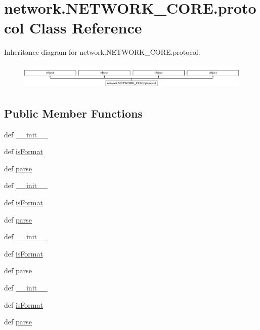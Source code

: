 \hypertarget{classnetwork_1_1NETWORK__CORE_1_1protocol}{}\section{network.\+N\+E\+T\+W\+O\+R\+K\+\_\+\+C\+O\+R\+E.\+protocol Class Reference}
\label{classnetwork_1_1NETWORK__CORE_1_1protocol}
Inheritance diagram for network.\+N\+E\+T\+W\+O\+R\+K\+\_\+\+C\+O\+R\+E.\+protocol\+:\begin{figure}[H]
\begin{center}
\leavevmode
\includegraphics[height=1.266968cm]{classnetwork_1_1NETWORK__CORE_1_1protocol}
\end{center}
\end{figure}
\subsection*{Public Member Functions}
\begin{DoxyCompactItemize}
\item 
def \hyperlink{classnetwork_1_1NETWORK__CORE_1_1protocol_a1754de4b9a84dd46742631cdf072b993}{\+\_\+\+\_\+init\+\_\+\+\_\+}
\item 
def \hyperlink{classnetwork_1_1NETWORK__CORE_1_1protocol_a22c7d1bdfecc7b95f22def27922a6a16}{is\+Format}
\item 
def \hyperlink{classnetwork_1_1NETWORK__CORE_1_1protocol_ae949ee38090c3c7f80aec9a232571fd4}{parse}
\item 
def \hyperlink{classnetwork_1_1NETWORK__CORE_1_1protocol_a1754de4b9a84dd46742631cdf072b993}{\+\_\+\+\_\+init\+\_\+\+\_\+}
\item 
def \hyperlink{classnetwork_1_1NETWORK__CORE_1_1protocol_a22c7d1bdfecc7b95f22def27922a6a16}{is\+Format}
\item 
def \hyperlink{classnetwork_1_1NETWORK__CORE_1_1protocol_ae949ee38090c3c7f80aec9a232571fd4}{parse}
\item 
def \hyperlink{classnetwork_1_1NETWORK__CORE_1_1protocol_a1754de4b9a84dd46742631cdf072b993}{\+\_\+\+\_\+init\+\_\+\+\_\+}
\item 
def \hyperlink{classnetwork_1_1NETWORK__CORE_1_1protocol_a22c7d1bdfecc7b95f22def27922a6a16}{is\+Format}
\item 
def \hyperlink{classnetwork_1_1NETWORK__CORE_1_1protocol_ae949ee38090c3c7f80aec9a232571fd4}{parse}
\item 
def \hyperlink{classnetwork_1_1NETWORK__CORE_1_1protocol_a1754de4b9a84dd46742631cdf072b993}{\+\_\+\+\_\+init\+\_\+\+\_\+}
\item 
def \hyperlink{classnetwork_1_1NETWORK__CORE_1_1protocol_a22c7d1bdfecc7b95f22def27922a6a16}{is\+Format}
\item 
def \hyperlink{classnetwork_1_1NETWORK__CORE_1_1protocol_ae949ee38090c3c7f80aec9a232571fd4}{parse}
\end{DoxyCompactItemize}
